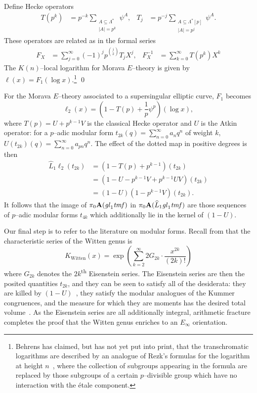\begin{theorem}
Define Hecke operators
\begin{align*}
T(p^k) & = p^{-k} \sum_{\substack{A \subseteq \Lambda^* \\ |A| = p^k}} \psi^A, &
T_j & = p^{-j} \sum_{\substack{A \subseteq \Lambda^*[p] \\ |A| = p^j}} \psi^A.
\end{align*}
These operators are related as in the formal series
\begin{align*}
F_X & = \sum_{j=0}^\infty (-1)^j p^{\binom{j}{2}} T_j X^j, &
F_X^{-1} & = \sum_{k=0}^\infty T(p^k) X^k
\end{align*}
The \(K(n)\)--local logarithm for Morava \(E\)--theory is given by \(\ell(x) = F_1(\log x)\).\footnote{Behrens has claimed, but has not yet put into print, that the transchromatic logarithms are described by an analogue of Rezk's formulas for the logarithm at height \(n\)~\cite[Subsections 1.10 and 1.12]{RezkLogarithm}, where the collection of subgroups appearing in the formula are replaced by those subgroups of a certain \(p\)--divisible group which have no interaction with the \'etale component.} \qed
\end{theorem}

\noindent For the Morava \(E\)--theory associated to a supersingular elliptic curve, \(F_1\) becomes \[\ell_2(x) = \left(1 - T(p) + \frac{1}{p} \psi^p\right)(\log x),\] where \(T(p) = U + p^{k-1} V\) is the classical Hecke operator and \(U\) is the Atkin operator: for a \(p\)--adic modular form \(t_{2k}(q) = \sum_{n=0}^\infty a_n q^n\) of weight \(k\), \(U(t_{2k})(q) = \sum_{n=0}^\infty a_{pn} q^n\).  The effect of the dotted map in positive degrees is then
\begin{align*}
\widehat L_1 \ell_2(t_{2k}) & = (1 - T(p) + p^{k-1})(t_{2k}) \\
& = (1 - U - p^{k-1} V + p^{k-1} UV)(t_{2k}) \\
& = (1 - U)(1 - p^{k-1}V)(t_{2k}).
\end{align*}
It follows that the image of \(\pi_0 \mathbf A(\mathit{gl}_1 \mathit{tmf})\) in \(\pi_0 \mathbf A(\widehat L_1 \mathit{gl}_1 \mathit{tmf})\) are those sequences of \(p\)--adic modular forms \(t_{4k}\) which additionally lie in the kernel of \((1 - U)\).

Our final step is to refer to the literature on modular forms.  Recall from  that the characteristic series of the Witten genus is \[K_{\mathrm{Witten}}(x) = \exp\left( \sum_{k=2}^\infty 2 G_{2k} \cdot \frac{x^{2k}}{(2k)!} \right)\] where \(G_{2k}\) denotes the \(2k\)\textsuperscript{th} Eisenstein series.  The Eisenstein series are then the posited quantities \(t_{2k}\), and they can be seen to satisfy all of the desiderata: they are killed by \((1 - U)\)~\cite[Proposition 15.3]{AHR}, they satisfy the modular analogues of the Kummer congruences, and the measure for which they are moments has the desired total volume~\cite[Proposition 10.10]{AHR}.  As the Eisenstein series are all additionally integral, arithmetic fracture completes the proof that the Witten genus enriches to an \(E_\infty\) orientation.




